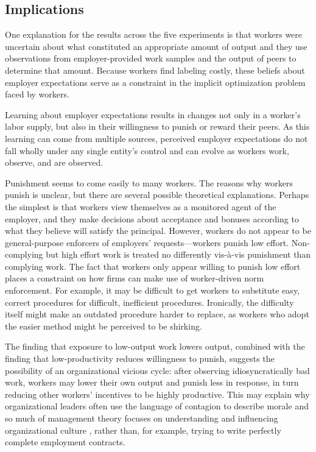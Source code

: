 \documentclass[12pt]{article}
\begin{document}
\subsection{Implications} 
One explanation for the results across the five experiments is that
workers were uncertain about what constituted an appropriate amount of
output and they use observations from employer-provided work samples
and the output of peers to determine that amount. Because workers find
labeling costly, these beliefs about employer expectations serve as a
constraint in the implicit optimization problem faced by workers.

Learning about employer expectations results in changes not only in a
worker's labor supply, but also in their willingness to punish or
reward their peers. As this learning can come from multiple sources,
perceived employer expectations do not fall wholly under any single
entity's control and can evolve as workers work, observe, and are
observed.

Punishment seems to come easily to many workers. The reasons why
workers punish is unclear, but there are several possible theoretical
explanations. Perhaps the simplest is that workers view themselves as
a monitored agent of the employer, and they make decisions about
acceptance and bonuses according to what they believe will satisfy the
principal. However, workers do not appear to be general-purpose
enforcers of employers' requests---workers punish low
effort. Non-complying but high effort work is treated no differently
vis-\`{a}-vis punishment than complying work. The fact that workers
only appear willing to punish low effort places a constraint on how
firms can make use of worker-driven norm enforcement. For example, it
may be difficult to get workers to substitute easy, correct procedures
for difficult, inefficient procedures. Ironically, the difficulty
itself might make an outdated procedure harder to replace, as workers
who adopt the easier method might be perceived to be shirking.

The finding that exposure to low-output work lowers output, combined
with the finding that low-productivity reduces willingness to punish,
suggests the possibility of an organizational vicious cycle: after
observing idiosyncratically bad work, workers may lower their own
output and punish less in response, in turn reducing other workers'
incentives to be highly productive. This may explain why
organizational leaders often use the language of contagion to describe
morale and so much of management theory focuses on understanding and
influencing organizational culture \citep{schein2004organizational},
rather than, for example, trying to write perfectly complete
employment contracts.
\end{document}

